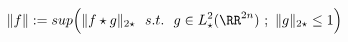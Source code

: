 \begin{equation}
	\Vert f\Vert:=sup\Big(\Vert f\star g\Vert_{2\star}~~s.t.~~g\in L^{2}_{\star}(\RR^{2n})~;~ \Vert g\Vert_{2\star}\leq 1\Big)
\end{equation}

